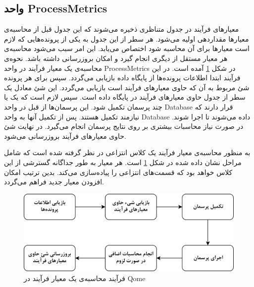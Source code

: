 \subsection{واحد ProcessMetrics}
معیارهای فرآیند در جدول متناظری ذخیره می‌شوند که  این جدول قبل از محاسبه‌ی معیارها مقداردهی اولیه می‌شود. هر سطر از این جدول به یکی از پرونده‌هایی که لازم است معیارها برای آن محاسبه شود اختصاص می‌یابد. این امر سبب می‌شود محاسبه‌ی هر معیار مستقل از دیگری انجام گیرد و امکان بروزرسانی داشته باشد. نحوه‌ی محاسبه‌ی یک معیار فرآیند در واحد ProcessMetrics در شکل \ref{fig:process-chart}  آمده است. در این فرآیند ابتدا اطلاعات پرونده‌ها از پایگاه داده بازیابی می‌گردد. سپس برای هر پرونده شئ مربوط به آن که حاوی معیارهای فرآیند است بازیابی می‌گردد. این شئ معادل یک سطر از جدول حاوی معیارهای فرآیند در پایگاه داده است. سپس لازم است که یک یا چند پرسمان تکمیل شود. این پرسمان‌ها از قبل در واحد Database  قرار دارند که نیازمند تکمیل هستند. پس از تکمیل آنها به واحد Database داده می‌شوند تا اجرا شوند. در صورت نیاز محاسبات بیشتری بر روی نتایج پرسمان انجام می‌گیرد. در نهایت شئ حاوی معیارهای فرآیند بروزرسانی می‌شود. 

به منظور محاسبه‌ی معیار فرآیند یک کلاس انتزاعی در نظر گرفته شده است که شامل مراحل نشان داده شده در شکل \ref{fig:process-chart}  است. هر معیار به طور جداگانه گسترشی از این کلاس خواهد بود که  قسمت‌های انتزاعی را پیاده‌سازی می‌کند. بدین ترتیب امکان افزودن معیار جدید فراهم می‌گردد. 
\begin{figure}[H]
	\centering
	\includegraphics[width=.8\textwidth]{img/method/process-chart.png}
	\caption{ فرآیند محاسبه‌ی یک معیار فرآیند در Qome}
	\label{fig:process-chart}
\end{figure}


